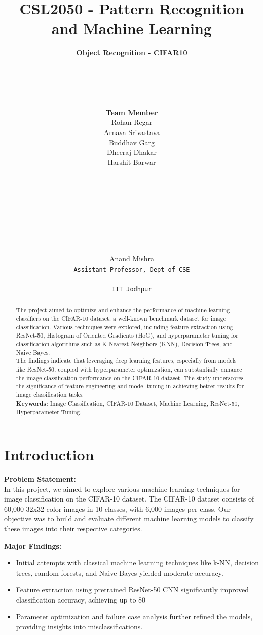 \documentclass[a4paper]{article}
\title{CSL2050 - Pattern Recognition and Machine Learning}
\author{
    \LARGE\textbf{Object Recognition - CIFAR10} \\
    \\ \\ \\ \\ \\
    \textbf{Team Member }\vspace{.5cm} \\
    Rohan Regar\vspace{} \\
    Arnava Srivastava \\
    Buddhav Garg \\
    Dheeraj Dhakar \\
    Harshit Barwar\\
    \\ \\
    \\ \\
}
\date{
        \\ \\
	 \\ \ \\%
	Anand Mishra \\ \texttt{Assistant Professor, Dept of CSE \\ \\ IIT Jodhpur}\\[2ex]%
}
\theoremstyle{plain}
\theoremstyle{definition}
\begin{document}
	\maketitle
        \newpage
	\begin{abstract}
 The project aimed to optimize and enhance the performance of machine learning classifiers on the CIFAR-10 dataset, a well-known benchmark dataset for image classification. Various techniques were explored, including feature extraction using ResNet-50, Histogram of Oriented Gradients (HoG), and hyperparameter tuning for classification algorithms such as K-Nearest Neighbors (KNN), Decision Trees, and Naive Bayes.\\
The findings indicate that leveraging deep learning features, especially from models like ResNet-50, coupled with hyperparameter optimization, can substantially enhance the image classification performance on the CIFAR-10 dataset. The study underscores the significance of feature engineering and model tuning in achieving better results for image classification tasks.\\
	
		\noindent\textbf{Keywords:} Image Classification, CIFAR-10 Dataset, Machine Learning, ResNet-50, Hyperparameter Tuning.
	\end{abstract}

	\tableofcontents
        \newpage
	\section{Introduction}
    \hspace{.5cm}\textbf{Problem Statement:}\\
    In this project, we aimed to explore various machine learning techniques for image classification on the CIFAR-10 dataset. The CIFAR-10 dataset consists of 60,000 32x32 color images in 10 classes, with 6,000 images per class. Our objective was to build and evaluate different machine learning models to classify these images into their respective categories.\vspace{.5cm}

    \textbf{Major Findings:}
    \begin{itemize}
    \item Initial attempts with classical machine learning techniques like k-NN, decision trees, random forests, and Naive Bayes yielded moderate accuracy.
    \item Feature extraction using pretrained ResNet-50 CNN significantly improved classification accuracy, achieving up to 80%
    \item Parameter optimization and failure case analysis further refined the models, providing insights into misclassifications.
    \end{itemize}\vspace{.5cm}
\end{document}
